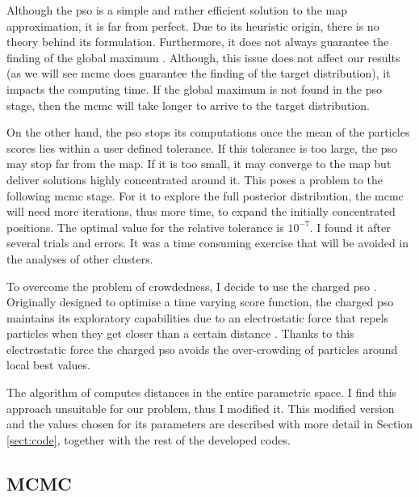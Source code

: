 Although the \gls{pso} is a simple and rather efficient solution to the \gls{map} approximation, it is far from perfect. Due to its heuristic origin, there is no theory behind its formulation. Furthermore, it does not always guarantee the finding of the global maximum \cite[for a convergence guaranteed version see][]{Patel2013}. Although,  this issue does not affect our results (as we will see \gls{mcmc} does guarantee the finding of the target distribution), it impacts the computing time. If the global maximum is not found in the \gls{pso} stage, then the \gls{mcmc} will take longer to arrive to the target distribution. 

On the other hand, the \gls{pso} stops its computations once the mean of the particles scores lies within a user defined tolerance. If this tolerance is too large, the \gls{pso} may stop far from the \gls{map}. If it is too small, it may converge to the \gls{map} but deliver solutions highly concentrated around it. This poses a problem to the following \gls{mcmc} stage. For it to explore the full posterior distribution, the \gls{mcmc} will need more iterations, thus more time, to expand the initially concentrated positions. {The optimal value for the relative tolerance is $10^{-7}$. I found it after several trials and errors. It was a time consuming exercise that will be avoided in the analyses of other clusters.} 

To overcome the problem of crowdedness, I decide to use the charged \gls{pso} \citep{Blackwell2002}. Originally designed to optimise a time varying score function, the charged \gls{pso} maintains its exploratory capabilities due to an electrostatic force that repels particles when they get closer than a certain distance \citep{Blackwell2002}. Thanks to this electrostatic force the charged \gls{pso} avoids the over-crowding of particles around local best values.

The algorithm of \citet{Blackwell2002} computes distances in the entire parametric space. I find this approach unsuitable for our problem, thus I modified it. {This modified version and the values chosen for its parameters are described with more detail in Section \ref{sect:code}, together with the rest of the developed codes. }

\subsection{MCMC}
\label{sect:MCMC}
